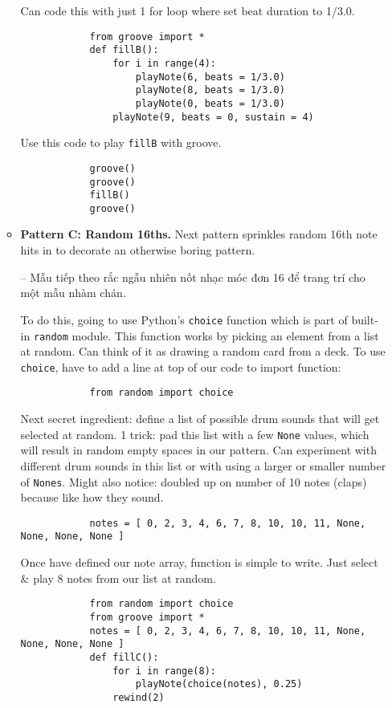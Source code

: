 \documentclass{article}
\begin{document}
\begin{itemize}
\begin{itemize}
		Can code this with just 1 for loop where set beat duration to 1/3.0.
		\begin{verbatim}
			from groove import *
			def fillB():
			    for i in range(4):
			        playNote(6, beats = 1/3.0)
			        playNote(8, beats = 1/3.0)
			        playNote(0, beats = 1/3.0)
			    playNote(9, beats = 0, sustain = 4)
		\end{verbatim}
		Use this code to play {\tt fillB} with groove.
		\begin{verbatim}
			groove()
			groove()
			fillB()
			groove()
		\end{verbatim}
		\item {\bf Pattern C: Random 16ths.} Next pattern sprinkles random 16th note hits in to decorate an otherwise boring pattern.
		
		-- Mẫu tiếp theo rắc ngẫu nhiên nốt nhạc móc đơn 16 để trang trí cho một mẫu nhàm chán.
		
		To do this, going to use Python's {\tt choice} function which is part of built-in {\tt random} module. This function works by picking an element from a list at random. Can think of it as drawing a random card from a deck. To use {\tt choice}, have to add a line at top of our code to import function:
		\begin{verbatim}
			from random import choice
		\end{verbatim}
		Next secret ingredient: define a list of possible drum sounds that will get selected at random. 1 trick: pad this list with a few {\tt None} values, which will result in random empty spaces in our pattern. Can experiment with different drum sounds in this list or with using a larger or smaller number of {\tt Nones}. Might also notice: doubled up on number of 10 notes (claps) because like how they sound.
		\begin{verbatim}
			notes = [ 0, 2, 3, 4, 6, 7, 8, 10, 10, 11, None, None, None, None ]
		\end{verbatim}
		Once have defined our note array, function is simple to write. Just select \& play 8 notes from our list at random.
		\begin{verbatim}
			from random import choice
			from groove import *
			notes = [ 0, 2, 3, 4, 6, 7, 8, 10, 10, 11, None, None, None, None ]
			def fillC():
			    for i in range(8):
			        playNote(choice(notes), 0.25)
			    rewind(2)
			

\end{verbatim}
\end{itemize}
\end{itemize}
\end{document}
